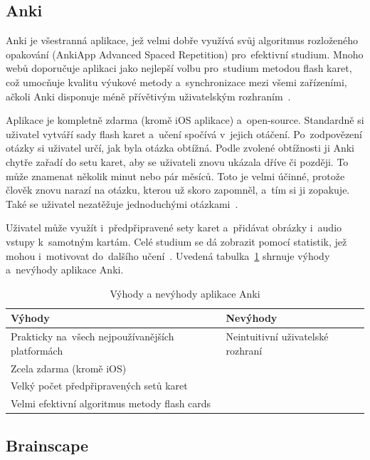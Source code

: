 \documentclass[twoside]{ctuthesis}
\begin{document}
\subsection{Anki}

Anki je všestranná aplikace, jež velmi dobře využívá svůj algoritmus rozloženého opakování (AnkiApp Advanced Spaced Repetition\texttrademark{}) pro~efektivní studium. Mnoho webů doporučuje aplikaci jako nejlepší volbu pro~studium metodou flash karet, což umocňuje kvalitu výukové metody a~synchronizace mezi všemi zařízeními, ačkoli Anki disponuje méně přívětivým uživatelským rozhraním~\cite{ransom, anki}.

Aplikace je kompletně zdarma (kromě iOS aplikace) a~open-source. Standardně si uživatel vytváří sady flash karet a~učení spočívá v~jejich otáčení. Po~zodpovězení otázky si uživatel určí, jak byla otázka obtížná. Podle zvolené obtížnosti ji Anki chytře zařadí do setu karet, aby se uživateli znovu ukázala dříve či později. To může znamenat několik minut nebo pár měsíců. Toto je velmi účinné, protože člověk znovu narazí na otázku, kterou už skoro zapomněl, a~tím si ji zopakuje. Také se uživatel nezatěžuje jednoduchými otázkami~\cite{poustka, ransom}.

Uživatel může využít i~předpřipravené sety karet a~přidávat obrázky i~audio vstupy k~samotným kartám. Celé studium se dá zobrazit pomocí statistik, jež mohou i~motivovat do~dalšího učení~\cite{anki}. Uvedená tabulka~\ref{tab:an} shrnuje výhody a~nevýhody aplikace Anki.

\begin{table}[H]
\caption{Výhody a nevýhody aplikace Anki}
\begin{tabular}{| >{\centering\arraybackslash}m{5cm} | >{\centering\arraybackslash}m{5cm} |}
\hline
\textbf{Výhody} & \textbf{Nevýhody} \\ \hline
Prakticky na~všech nejpoužívanějších platformách & Neintuitivní uživatelské rozhraní \\ \hline
Zcela zdarma (kromě iOS) & \\ \hline
Velký počet předpřipravených setů karet  & \\ \hline
Velmi efektivní algoritmus metody flash cards & \\ \hline
\end{tabular}
\label{tab:an}
\end{table}

\subsection{Brainscape}
\end{document}
